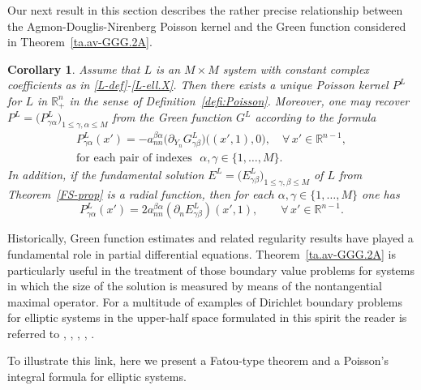 \documentclass[11pt,reqno]{amsart}
\numberwithin{equation}{section}
\newtheorem{corollary}[theorem]{Corollary}
\theoremstyle{remark}
\begin{document}
Our next result in this section describes the rather precise relationship between the 
Agmon-Douglis-Nirenberg Poisson kernel and the Green function considered in Theorem~\ref{ta.av-GGG.2A}. 

\begin{corollary}\label{y6tFFF.cc}
Assume that $L$ is an $M\times M$ system with constant complex coefficients as in 
\eqref{L-def}-\eqref{L-ell.X}. Then there exists a unique Poisson kernel $P^L$ for 
$L$ in ${\mathbb{R}}^n_{+}$ in the sense of Definition~\ref{defi:Poisson}. Moreover, 
one may recover $P^L=\big(P^L_{\gamma\alpha}\big)_{1\leq\gamma,\alpha\leq M}$ from 
the Green function $G^L$ according to the formula 
%
\begin{equation}\label{Ua-eD.LBBw.3B}
\begin{array}{c}
P^L_{\gamma\alpha}(x')=-a^{\beta\alpha}_{nn}
\big(\partial_{Y_n} G^{L}_{\gamma\beta}\big)\big((x',1),0\big),
\quad\forall\,x'\in{\mathbb{R}}^{n-1},
\\[6pt]
\text{for each pair of indexes }\,\,\alpha,\gamma\in\{1,\dots,M\}.
\end{array}
\end{equation}
%
In addition, if the fundamental solution $E^L=\big(E^L_{\gamma\beta}\big)_{1\leq\gamma,\beta\leq M}$ 
of $L$ from Theorem~\ref{FS-prop} is a radial function, then for 
each $\alpha,\gamma\in\{1,\dots,M\}$ one has
%
\begin{equation}\label{Ua-eD.kab}
P^L_{\gamma\alpha}(x')=2a^{\beta\alpha}_{nn}(\partial_n E^L_{\gamma\beta})(x',1),
\qquad\forall\,x'\in{\mathbb{R}}^{n-1}.
\end{equation}
\end{corollary}

Historically, Green function estimates and related regularity results have played a fundamental 
role in partial differential equations. Theorem~\ref{ta.av-GGG.2A} is particularly useful in the 
treatment of those boundary value problems for systems in which the size of the solution is measured 
by means of the nontangential maximal operator. For a multitude of examples of Dirichlet boundary 
problems for elliptic systems in the upper-half space formulated in this spirit the reader is 
referred to \cite{MMMM16}, \cite{GHA.V}, \cite{MMMMM}, \cite{LaMi24}, \cite{MiTak24}.

To illustrate this link, here we present a Fatou-type theorem and a Poisson's integral formula for elliptic systems. 
\end{document}
